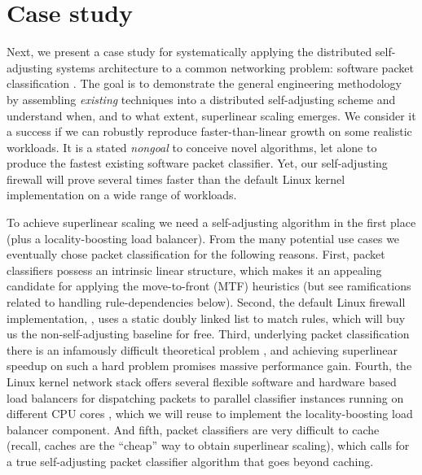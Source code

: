 \section{Case study }\label{sec:case-study}

Next, we present a case study for systematically applying the distributed self-adjusting systems architecture to a common networking problem: software packet classification \cite{gupta2001algorithms}. The goal is to demonstrate the general engineering methodology by assembling \emph{existing} techniques into a distributed self-adjusting scheme and understand when, and to what extent, superlinear scaling emerges. We consider it a success if we can robustly reproduce faster-than-linear growth on some realistic workloads. It is a stated \emph{nongoal} to conceive novel algorithms, let alone to produce the fastest existing software packet classifier. %
Yet, our self-adjusting firewall will prove several times faster than the default Linux kernel implementation on a wide range of workloads.

To achieve superlinear scaling we need a self-adjusting algorithm in the first place (plus a locality-boosting load balancer). From the many potential use cases %
\cite{SleatorT85Splay, BentleyCL93, HesterH85, HesterH85, BentleySTW86, Avin0020, ParkM12} we eventually chose packet classification for the following reasons.  First, packet classifiers possess an intrinsic linear structure, %
which makes it an appealing candidate for applying the move-to-front (MTF) heuristics (but see ramifications related to handling rule-dependencies below). Second, the default Linux firewall implementation, \nftables, uses a static doubly linked list to match rules, which will buy us the non-self-adjusting baseline for free. Third, underlying packet classification there is an infamously difficult theoretical problem \cite{10.1145/2619239.2626294,10.1006/jagm.1996.0063, PacutVAPRS2022, 10.1145/2619239.2626294, 10.1145/1851182.1851208, 10.1145/863955.863980, gupta2001algorithms, 10.1145/3359989.3365431}, and achieving superlinear speedup on such a hard problem promises massive performance gain. Fourth, the Linux kernel network stack offers several flexible software and hardware based load balancers for dispatching packets to parallel classifier instances running on different CPU cores \cite{rss-linux}, which we will reuse to implement the locality-boosting load balancer component. And fifth, packet classifiers are very difficult to cache \cite{1354643} (recall, caches are the ``cheap'' way to obtain superlinear scaling), which calls for a true self-adjusting packet classifier algorithm that goes beyond caching. %

